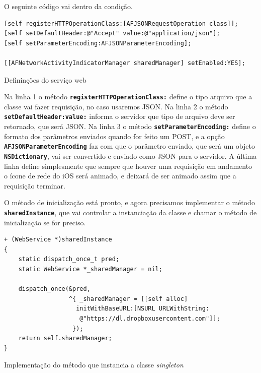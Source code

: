 \documentclass[a4paper,12pt,brazil,oneside]{book}
\begin{document}
O seguinte código vai dentro da condição.

\begin{listing}[H]
\begin{verbatim}
[self registerHTTPOperationClass:[AFJSONRequestOperation class]];
[self setDefaultHeader:@"Accept" value:@"application/json"];
[self setParameterEncoding:AFJSONParameterEncoding];

[[AFNetworkActivityIndicatorManager sharedManager] setEnabled:YES];
\end{verbatim}
\caption{Defininções do serviço web}
\end{listing}


Na linha 1 o método \texttt{\textbf{registerHTTPOperationClass:}} define o tipo arquivo que a classe vai fazer requisição, no caso usaremos JSON. Na linha 2 o método\\ \texttt{\textbf{setDefaultHeader:value:}} informa o servidor que tipo de arquivo deve ser retornado, que será JSON. Na linha 3 o método \texttt{\textbf{setParameterEncoding:}} define o formato dos parâmetros enviados quando for feito um POST, e a opção \texttt{\textbf{AFJSONParameterEncoding}} faz com que o parâmetro enviado, que será um objeto \texttt{\textbf{NSDictionary}}, vai ser convertido e enviado como JSON para o servidor. A última linha define simplesmente que sempre que houver uma requisição em andamento o ícone de rede do iOS será animado, e deixará de ser animado assim que a requisição terminar.

O método de inicialização está pronto, e agora precisamos implementar o método\\ \texttt{\textbf{sharedInstance}}, que vai controlar a instanciação da classe e chamar o método de inicialização se for preciso.

\begin{listing}[H]
\begin{verbatim}
+ (WebService *)sharedInstance
{
    static dispatch_once_t pred;
    static WebService *_sharedManager = nil;
    
    dispatch_once(&pred,
                  ^{ _sharedManager = [[self alloc]
                    initWithBaseURL:[NSURL URLWithString:
                     @"https://dl.dropboxusercontent.com"]];
                   });
    return self.sharedManager;
}
\end{verbatim}
\caption{Implementação do método que instancia a classe \emph{singleton}}
\end{listing}
\end{document}

